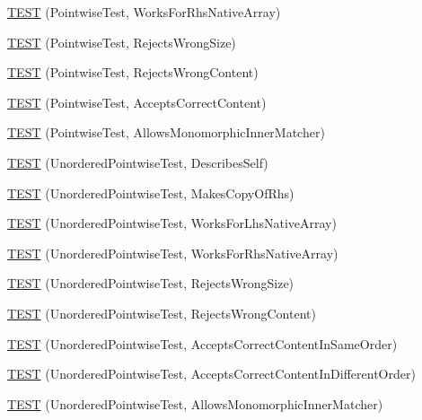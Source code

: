 \begin{DoxyCompactItemize}
\item 
\hyperlink{namespacetesting_1_1gmock__matchers__test_adabf6a3ceda0024d630d2ece31e37f7c}{T\+E\+ST} (Pointwise\+Test, Works\+For\+Rhs\+Native\+Array)
\item 
\hyperlink{namespacetesting_1_1gmock__matchers__test_a1f73a8fa9dd9560bd606a990444a81fe}{T\+E\+ST} (Pointwise\+Test, Rejects\+Wrong\+Size)
\item 
\hyperlink{namespacetesting_1_1gmock__matchers__test_a135ad7162da91c9a234193fbbe5ef775}{T\+E\+ST} (Pointwise\+Test, Rejects\+Wrong\+Content)
\item 
\hyperlink{namespacetesting_1_1gmock__matchers__test_a42b98b370f1897cecfafbbfba53f4f38}{T\+E\+ST} (Pointwise\+Test, Accepts\+Correct\+Content)
\item 
\hyperlink{namespacetesting_1_1gmock__matchers__test_a9bbef6d651166c37af32c54923bcd849}{T\+E\+ST} (Pointwise\+Test, Allows\+Monomorphic\+Inner\+Matcher)
\item 
\hyperlink{namespacetesting_1_1gmock__matchers__test_af3307f88a321331155a146d49974e3e3}{T\+E\+ST} (Unordered\+Pointwise\+Test, Describes\+Self)
\item 
\hyperlink{namespacetesting_1_1gmock__matchers__test_a05e9bbee9d19692f45a846c2ff45e016}{T\+E\+ST} (Unordered\+Pointwise\+Test, Makes\+Copy\+Of\+Rhs)
\item 
\hyperlink{namespacetesting_1_1gmock__matchers__test_a57e330a5ae600f65d4daa2ed57bbc887}{T\+E\+ST} (Unordered\+Pointwise\+Test, Works\+For\+Lhs\+Native\+Array)
\item 
\hyperlink{namespacetesting_1_1gmock__matchers__test_ae75a933b86db4c43a7bec2ffa97692ef}{T\+E\+ST} (Unordered\+Pointwise\+Test, Works\+For\+Rhs\+Native\+Array)
\item 
\hyperlink{namespacetesting_1_1gmock__matchers__test_a50412d02c70f8303a087e6832d26ba62}{T\+E\+ST} (Unordered\+Pointwise\+Test, Rejects\+Wrong\+Size)
\item 
\hyperlink{namespacetesting_1_1gmock__matchers__test_a9a9a85c6598ab74463703acbd01aa1a7}{T\+E\+ST} (Unordered\+Pointwise\+Test, Rejects\+Wrong\+Content)
\item 
\hyperlink{namespacetesting_1_1gmock__matchers__test_aa68bf48e4a8fa41fcd60f59cc60ede8f}{T\+E\+ST} (Unordered\+Pointwise\+Test, Accepts\+Correct\+Content\+In\+Same\+Order)
\item 
\hyperlink{namespacetesting_1_1gmock__matchers__test_a3d48732b4a6069cfcf5c0dde6027dad5}{T\+E\+ST} (Unordered\+Pointwise\+Test, Accepts\+Correct\+Content\+In\+Different\+Order)
\item 
\hyperlink{namespacetesting_1_1gmock__matchers__test_af16d28a9f3a07b8ef2962b868b4f8399}{T\+E\+ST} (Unordered\+Pointwise\+Test, Allows\+Monomorphic\+Inner\+Matcher)
\end{DoxyCompactItemize}
